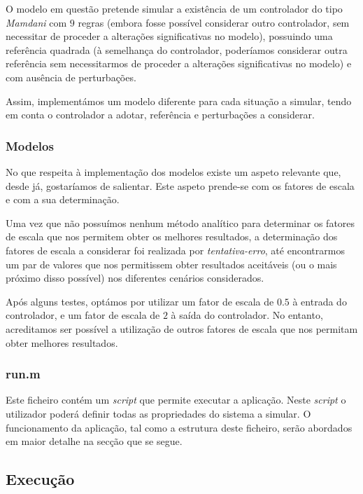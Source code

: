 \documentclass{article}
\begin{document}
O modelo em questão pretende simular a existência de um controlador do tipo \emph{Mamdani} com $9$ regras (embora fosse possível considerar outro controlador, sem necessitar de proceder a alterações significativas no modelo), possuindo uma referência quadrada (à semelhança do controlador, poderíamos considerar outra referência sem necessitarmos de proceder a alterações significativas no modelo) e com ausência de perturbações.

Assim, implementámos um modelo diferente para cada situação a simular, tendo em conta o controlador a adotar, referência e perturbações a considerar.

\subsubsection{Modelos}

No que respeita à implementação dos modelos existe um aspeto relevante que, desde já, gostaríamos de salientar. Este aspeto prende-se com os fatores de escala e com a sua determinação.

Uma vez que não possuímos nenhum método analítico para determinar os fatores de escala que nos permitem obter os melhores resultados, a determinação dos fatores de escala a considerar foi realizada por \emph{tentativa-erro}, até encontrarmos um par de valores que nos permitissem obter resultados aceitáveis (ou o mais próximo disso possível) nos diferentes cenários considerados.

Após alguns testes, optámos por utilizar um fator de escala de $0.5$ à entrada do controlador, e um fator de escala de $2$ à saída do controlador. No entanto, acreditamos ser possível a utilização de outros fatores de escala que nos permitam obter melhores resultados.

\subsubsection{run.m}

Este ficheiro contém um \emph{script} que permite executar a aplicação. Neste \emph{script} o utilizador poderá definir todas as propriedades do sistema a simular. O funcionamento da aplicação, tal como a estrutura deste ficheiro, serão abordados em maior detalhe na secção que se segue.


\subsection{Execução}
\end{document}
